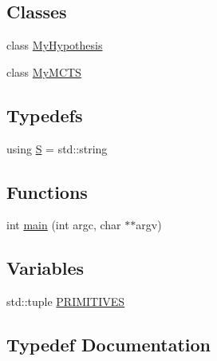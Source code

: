 \subsection*{Classes}
\begin{DoxyCompactItemize}
\item 
class \hyperlink{class_my_hypothesis}{My\+Hypothesis}
\item 
class \hyperlink{class_my_m_c_t_s}{My\+M\+C\+TS}
\end{DoxyCompactItemize}
\subsection*{Typedefs}
\begin{DoxyCompactItemize}
\item 
using \hyperlink{_models_2_formal_language_theory-_simple_2_main_8cpp_a51c40915539205f0b5add30b0d68a4cb}{S} = std\+::string
\end{DoxyCompactItemize}
\subsection*{Functions}
\begin{DoxyCompactItemize}
\item 
int \hyperlink{_models_2_formal_language_theory-_simple_2_main_8cpp_a3c04138a5bfe5d72780bb7e82a18e627}{main} (int argc, char $\ast$$\ast$argv)
\end{DoxyCompactItemize}
\subsection*{Variables}
\begin{DoxyCompactItemize}
\item 
std\+::tuple \hyperlink{_models_2_formal_language_theory-_simple_2_main_8cpp_a04e6d8e4b74d3f4fc965e5e5449158a3}{P\+R\+I\+M\+I\+T\+I\+V\+ES}
\end{DoxyCompactItemize}


\subsection{Typedef Documentation}
\mbox{\label{_models_2_formal_language_theory-_simple_2_main_8cpp_a51c40915539205f0b5add30b0d68a4cb}} 
